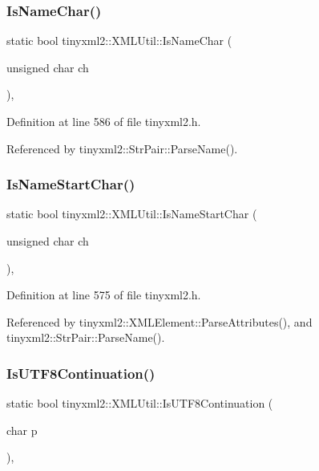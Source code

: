 \subsubsection{Is\+Name\+Char()}
{\footnotesize\ttfamily static bool tinyxml2\+::\+X\+M\+L\+Util\+::\+Is\+Name\+Char (\begin{DoxyParamCaption}\item[{unsigned char}]{ch }\end{DoxyParamCaption})\hspace{0.3cm}{\ttfamily [inline]}, {\ttfamily [static]}}



Definition at line 586 of file tinyxml2.\+h.



Referenced by tinyxml2\+::\+Str\+Pair\+::\+Parse\+Name().

\mbox{\label{classtinyxml2_1_1_x_m_l_util_abe106a69ac4d942a4381a4d9dfd0e0bd}} 
\subsubsection{Is\+Name\+Start\+Char()}
{\footnotesize\ttfamily static bool tinyxml2\+::\+X\+M\+L\+Util\+::\+Is\+Name\+Start\+Char (\begin{DoxyParamCaption}\item[{unsigned char}]{ch }\end{DoxyParamCaption})\hspace{0.3cm}{\ttfamily [inline]}, {\ttfamily [static]}}



Definition at line 575 of file tinyxml2.\+h.



Referenced by tinyxml2\+::\+X\+M\+L\+Element\+::\+Parse\+Attributes(), and tinyxml2\+::\+Str\+Pair\+::\+Parse\+Name().

\mbox{\label{classtinyxml2_1_1_x_m_l_util_ad7fd82e0fe610d73ef7bf9f359f104a3}} 
\subsubsection{Is\+U\+T\+F8\+Continuation()}
{\footnotesize\ttfamily static bool tinyxml2\+::\+X\+M\+L\+Util\+::\+Is\+U\+T\+F8\+Continuation (\begin{DoxyParamCaption}\item[{char}]{p }\end{DoxyParamCaption})\hspace{0.3cm}{\ttfamily [inline]}, {\ttfamily [static]}}



